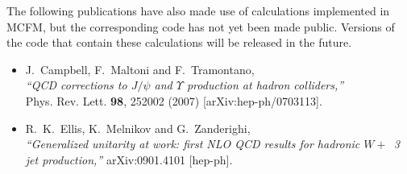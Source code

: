 \documentclass[12pt]{article}
\begin{document}
The following publications have also made use of calculations
implemented in MCFM, but the corresponding code has not yet been made
public. Versions of the code that contain these calculations will be
released in the future.

\begin{itemize}
\item J.~Campbell, F.~Maltoni and F.~Tramontano, \\
  {\it ``QCD corrections to $J/\psi$ and $\Upsilon$ production
  at hadron colliders,''} \\
  Phys. Rev. Lett. {\bf 98}, 252002 (2007)
  [arXiv:hep-ph/0703113].
\item R.~K.~Ellis, K.~Melnikov and G.~Zanderighi,\\
  {\it ``Generalized unitarity at work: first NLO QCD results for hadronic $W+$~3 jet production,''}
  arXiv:0901.4101 [hep-ph].
\end{itemize}

\clearpage
\end{document}

